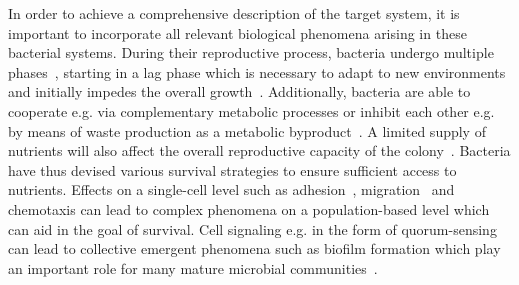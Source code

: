 \documentclass[10pt,A4paper]{article}
\numberwithin{equation}{section}
\begin{document}

In order to achieve a comprehensive description of the target system, it is important to incorporate
all relevant biological phenomena arising in these bacterial systems.
During their reproductive process, bacteria undergo multiple phases~\cite{buchanan_when_1997}, starting in a lag phase which
is necessary to adapt to new environments and initially impedes the overall growth~\cite{rolfe_lag_2012, monod_growth_1949}.
Additionally, bacteria are able to cooperate e.g. via complementary metabolic processes or inhibit
each other e.g. by means of waste production as a metabolic byproduct~\cite{west_social_2007, rainey_evolution_2003, hibbing_bacterial_2010, stubbendieck_bacterial_2016}.
A limited supply of nutrients will also affect the overall reproductive capacity of the colony~\cite{monod_growth_1949}.
Bacteria have thus devised various survival strategies to ensure sufficient access to nutrients.
Effects on a single-cell level such as adhesion~\cite{htuson_bacteriasurface_2013}, migration~\cite{decoene_microscopic_2011} and chemotaxis can lead to complex
phenomena on a population-based level which can aid in the goal of survival.
Cell signaling e.g. in the form of quorum-sensing can lead to collective emergent phenomena such as
biofilm formation which play an important role for many mature microbial communities~\cite{Jin2020,ng_bacterial_2009}.
\end{document}
